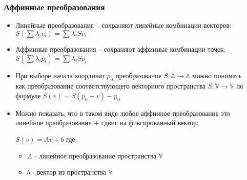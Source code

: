 \documentclass{beamer}
\begin{document}
\begin{frame}[fragile]
\frametitle{Аффинные преобразования}
\begin{itemize}
\item Линейные преобразования -- сохраняют линейные комбинации векторов: \begin{math}S \left(\sum \lambda_i v_i\right) = \sum \lambda_i S v_i\end{math}
\pause
\item Аффинные преобразования -- сохраняют аффинные комбинации точек: \begin{math}S \left(\sum \lambda_i p_i\right) = \sum \lambda_i S p_i\end{math}
\pause
\item При выборе начала координат \begin{math}p_0\end{math} преобразование \begin{math}S: \mathbb A \rightarrow \mathbb A\end{math} можно понимать как преобразование соответствующего векторного пространства
\begin{math}S: \mathbb V \rightarrow \mathbb V\end{math} по формуле \begin{math}S(v) = S(p_0 + v) - p_0\end{math}
\pause
\item Можно показать, что в таком виде любое аффинное преобразование это линейное преобразование + сдвиг на фиксированный вектор:

\begin{math}S(v) = Av + b\end{math}
где
\begin{itemize}
\item \begin{math}A\end{math} - линейное преобразование пространства \begin{math}\mathbb V\end{math}
\item \begin{math}b\end{math} - вектор из пространства \begin{math}\mathbb V\end{math}
\end{itemize}
\end{itemize}
\end{frame}
\end{document}
